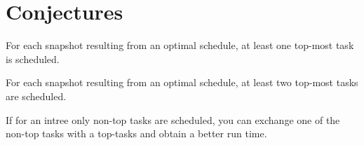 
\section{Conjectures}
\label{sec:p3-conjectures}

\begin{conjecture}
  For each snapshot resulting from an optimal schedule, at least one top-most task is scheduled.
\end{conjecture}

\begin{conjecture}
  For each snapshot resulting from an optimal schedule, at least two top-most tasks are scheduled.
\end{conjecture}

\begin{conjecture}
  If for an intree only non-top tasks are scheduled, you can exchange one of the non-top tasks with a top-tasks and obtain a better run time.
\end{conjecture}

